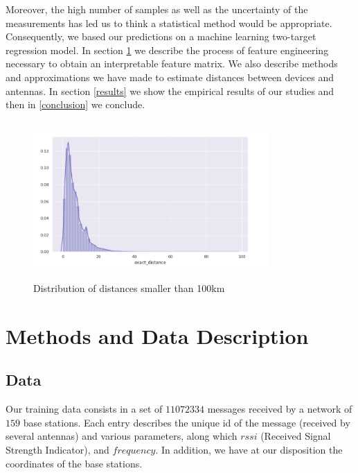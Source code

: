\documentclass[twocolumn,2pt]{article}
\begin{document}
	Moreover, the high number of samples as well as the uncertainty of the measurements has led us to think a statistical method would be appropriate. Consequently, we based our predictions on a machine learning two-target regression model. In section \ref{methods} we describe the process of feature engineering necessary to obtain an interpretable feature matrix. We also describe methods and approximations we have made to estimate distances between devices and antennas. In section \ref{results} we show the empirical results of our studies and then in \ref{conclusion} we conclude.

	\begin{figure}[H]
		\includegraphics[width=9cm, height=6cm]{graphes/distance_distrib.png}
		\caption{Distribution of distances smaller than 100km}
		\label{distance_distrib}		
	\end{figure}
	\vspace{-20pt}


	\section{Methods and Data Description}
	\label{methods}
	\subsection{Data}
	Our training data consists in a set of $11 072 334$ messages received by a network of $159$ base stations. Each entry describes the unique id of the message (received by several antennas) and various parameters, along which $rssi$ (Received Signal Strength Indicator), and $frequency$. In addition, we have at our disposition the coordinates of the base stations.
	
\end{document}
